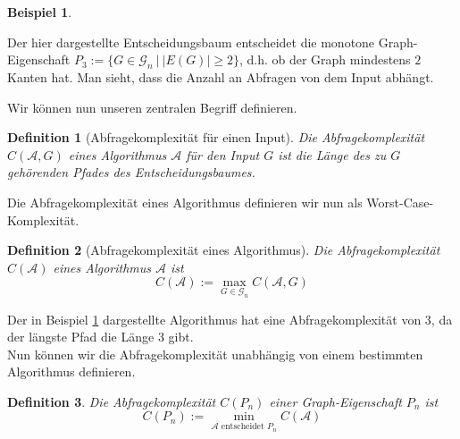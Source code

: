 \documentclass[a4paper]{scrreprt}
\newtheorem{definition}{Definition}
\theoremstyle{definition}
\newtheorem{example}{Beispiel}
\begin{document}
\begin{example}
\label{exmpl:decisionTree}
\begin{tikzpicture}

\end{tikzpicture}
Der hier dargestellte Entscheidungsbaum entscheidet
die monotone Graph-Eigenschaft 
$P_3 := \big\{ G \in \mathcal{G}_n \ \big| \ |E(G)| \geq 2 \big\}$,
d.h. ob der Graph mindestens $2$ Kanten hat.
Man sieht, dass die Anzahl an Abfragen von
dem Input abhängt.
\end{example}

Wir können nun unseren zentralen Begriff definieren.
\begin{definition}[Abfragekomplexität für einen Input]
Die \emph{Abfragekomplexität} $C(\mathcal{A},G)$ eines
Algorithmus $\mathcal{A}$ für den Input $G$ ist
die Länge des zu $G$ gehörenden Pfades des
Entscheidungsbaumes.
\end{definition}
Die Abfragekomplexität eines Algorithmus definieren
wir nun als Worst-Case-Komplexität.
\begin{definition}[Abfragekomplexität eines Algorithmus]
Die \emph{Abfragekomplexität} $C(\mathcal{A})$ eines
Algorithmus $\mathcal{A}$ ist
$$ C(\mathcal{A}) := \max_{G \in \mathcal{G}_n} C(\mathcal{A},G)$$
\end{definition}
Der in Beispiel \ref{exmpl:decisionTree} dargestellte
Algorithmus hat eine Abfragekomplexität von $3$, da
der längste Pfad die Länge $3$ gibt. \\
Nun können wir die Abfragekomplexität unabhängig
von einem bestimmten Algorithmus definieren.
\begin{definition}
Die \emph{Abfragekomplexität} $C(P_n)$ einer Graph-Eigenschaft
$P_n$ ist
$$ C(P_n) := \min_{\mathcal{A} \text{ entscheidet } P_n} C(\mathcal{A})$$
\end{definition}

\printbibliography
\end{document}
